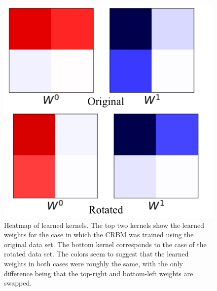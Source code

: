 \documentclass[12pt]{article}
\begin{document}
\begin{figure}[t!]
\begin{center}
    \includegraphics[width=1.0\columnwidth]{figures/learned_kernels_2by2_combined_heatmap.png}
\end{center}
\caption{Heatmap of learned kernels. The top two kernels show the learned weights for the case in which the CRBM was trained using the original data set. The bottom kernel corresponds to the case of the rotated data set. The colors seem to suggest that the learned weights in both cases were roughly the same, with the only difference being that the top-right and bottom-left weights are swapped.}
\label{fig:2by2_kernels_heatmap}
\end{figure}
\end{document}
